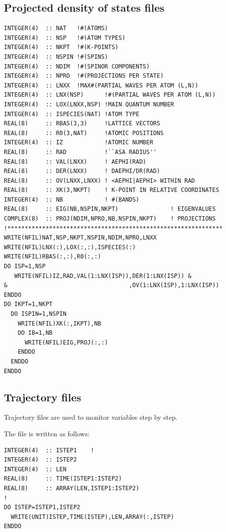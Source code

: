 \documentclass[final,12pt]{article}
\begin{document}
{{{{{{%
\subsection{Projected density of states files}
\begin{verbatim}
INTEGER(4)  :: NAT   !#(ATOMS)
INTEGER(4)  :: NSP   !#(ATOM TYPES)
INTEGER(4)  :: NKPT  !#(K-POINTS)
INTEGER(4)  :: NSPIN !#(SPINS)
INTEGER(4)  :: NDIM  !#(SPINOR COMPONENTS)
INTEGER(4)  :: NPRO  !#(PROJECTIONS PER STATE)
INTEGER(4)  :: LNXX  !MAX#(PARTIAL WAVES PER ATOM (L,N))
INTEGER(4)  :: LNX(NSP)      !#(PARTIAL WAVES PER ATOM (L,N))
INTEGER(4)  :: LOX(LNXX,NSP) !MAIN QUANTUM NUMBER
INTEGER(4)  :: ISPECIES(NAT) !ATOM TYPE
REAL(8)     :: RBAS(3,3)     !LATTICE VECTORS
REAL(8)     :: R0(3,NAT)     !ATOMIC POSITIONS 
INTEGER(4)  :: IZ            !ATOMIC NUMBER
REAL(8)     :: RAD           !``ASA RADIUS''
REAL(8)     :: VAL(LNXX)     ! AEPHI(RAD)
REAL(8)     :: DER(LNXX)     ! DAEPHI/DR(RAD)
REAL(8)     :: OV(LNXX,LNXX) ! <AEPHI|AEPHI> WITHIN RAD
REAL(8)     :: XK(3,NKPT)    ! K-POINT IN RELATIVE COORDINATES
INTEGER(4)  :: NB            ! #(BANDS)
REAL(8)     :: EIG(NB,NSPIN,NKPT)               ! EIGENVALUES
COMPLEX(8)  :: PROJ(NDIM,NPRO,NB,NSPIN,NKPT)    ! PROJECTIONS
!**************************************************************
WRITE(NFIL)NAT,NSP,NKPT,NSPIN,NDIM,NPRO,LNXX
WRITE(NFIL)LNX(:),LOX(:,:),ISPECIES(:)
WRITE(NFIL)RBAS(:,:),R0(:,:)
DO ISP=1,NSP
   WRITE(NFIL)IZ,RAD,VAL(1:LNX(ISP)),DER(1:LNX(ISP)) &
&                                   ,OV(1:LNX(ISP),1:LNX(ISP))
ENDDO
DO IKPT=1,NKPT
  DO ISPIN=1,NSPIN
    WRITE(NFIL)XK(:,IKPT),NB
    DO IB=1,NB
      WRITE(NFIL)EIG,PROJ(:,:)
    ENDDO
  ENDDO
ENDDO
\end{verbatim}


\subsection{Trajectory files}
Trajectory files are used to monitor variables step by step. 

The file is written as follows:
\begin{verbatim}
INTEGER(4)  :: ISTEP1    !
INTEGER(4)  :: ISTEP2
INTEGER(4)  :: LEN
REAL(8)     :: TIME(ISTEP1:ISTEP2)
REAL(8)     :: ARRAY(LEN,ISTEP1:ISTEP2)
!
DO ISTEP=ISTEP1,ISTEP2
  WRITE(UNIT)ISTEP,TIME(ISTEP),LEN,ARRAY(:,ISTEP)
ENDDO
\end{verbatim}

}}}}}}
\end{document}
